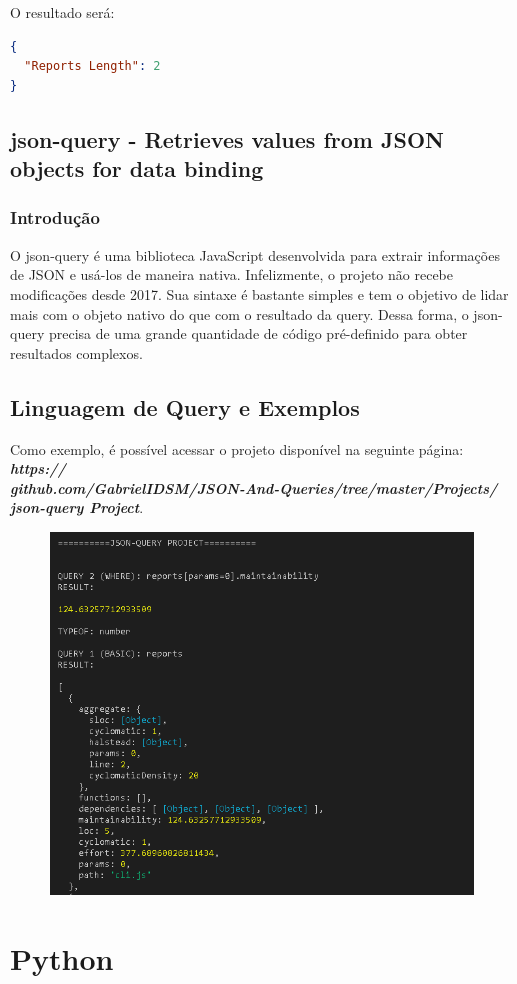 \documentclass[a4paper, 12pt] {article}
\begin{document}
				O resultado será:
\begin{lstlisting}[language=json,firstnumber=1]
{
  "Reports Length": 2
}
\end{lstlisting}
		\newpage \subsection{json-query - Retrieves values from JSON objects for data binding}
			\subsubsection{Introdução}
				O json-query é uma biblioteca JavaScript desenvolvida para extrair informações de JSON e usá-los de maneira nativa. Infelizmente, o projeto não recebe modificações desde 2017. Sua sintaxe é bastante simples e tem o objetivo de lidar mais com o objeto nativo do que com o resultado da query. Dessa forma, o json-query precisa de uma grande quantidade de código pré-definido para obter resultados complexos.
			
			\subsection{Linguagem de Query e Exemplos}
				Como exemplo, é possível acessar o projeto disponível na seguinte página: \textbf{\textit{https://\\github.com/GabrielIDSM/JSON-And-Queries/tree/master/Projects/\\json-query Project}}.

				\begin{figure}[H]
					\centering
					\includegraphics[width=16cm]{terminal.png}
					\label{figure:Image}
				\end{figure}
	\newpage \section{Python}
\end{document}
